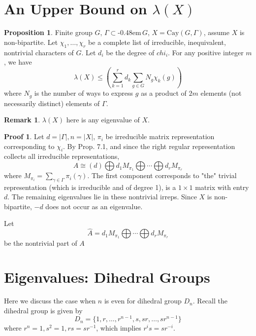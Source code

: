\documentclass{book}
\newcommand{\syin}{$\subset$\kern-0.48em\raisebox{.20ex}{\tiny S}$\,$}
\newcommand{\abs}[1]{\lvert #1 \rvert }
\newcommand{\Cay}[1]{\textrm{Cay}( #1 )}
\theoremstyle{definition}
\newtheorem{proposition}[lemma]{Proposition}
\theoremstyle{remarkstyle}
\newtheorem*{remark}{Remark}%
\newtheorem*{myproof}{Proof}%
\begin{document}
\section{An Upper Bound on $\lambda(X)$}
\begin{proposition}
    Finite group $G$, $\Gamma$\syin$G$, $X=\Cay{G,\Gamma}$, assume $X$ is non-bipartite. Let $\chi_1,\dots,\chi_r$ be a complete list of irreducible, inequivalent, nontrivial characters of $G$. Let $d_i$ be the degree of $chi_i$. For any positive integer $m$, we have 
    $$
    \lambda(X) \le \left(
    \sum^r_{k=1}d_k\sum_{g\in G}N_g\chi_k(g)
    \right)
    $$
    where $N_g$ is the number of ways to express $g$ as a product of $2m$ elements (not necessarily distinct) elements of $\Gamma$.
\end{proposition}
\begin{remark}
    $\lambda(X)$ here is any eigenvalue of $X$.
\end{remark}
\begin{myproof}
    Let $d=\abs{\Gamma}, n=\abs{X}$, $\pi_i$ be irreducible matrix representation corresponding to $\chi_i$. By Prop. 7.1, and since the right regular representation collects all irreducible representations,
    $$
    A \cong (d)\bigoplus d_1M_{\pi_1} \bigoplus \cdots \bigoplus d_rM_{\pi_r}
    $$
    where $M_{\pi_i} = \sum_{\gamma\in\Gamma}\pi_i(\gamma) $. The first component corresponds to "the" trivial representation (which is irreducible and of degree 1), is a $1\times 1$ matrix with entry $d$. The remaining eigenvalues lie in these nontrivial irreps. Since $X$ is non-bipartite, $-d$ does not occur as an eigenvalue. \newline

    Let 
    $$
    \hat{A} = d_1M_{\pi_1} \bigoplus \cdots \bigoplus d_rM_{\pi_r} 
    $$
    be the nontrivial part of $A$
\end{myproof}




\section{Eigenvalues: Dihedral Groups}
Here we discuss the case when $n$ is even for dihedral group $D_n$. Recall the dihedral group is given by 
$$
D_n = \{1, r, \dots, r^{n-1}, s, sr, \dots, sr^{n-1}\}
$$
where $r^n=1,s^2=1,rs=sr^{-1}$, which implies $r^is=sr^{-i} $. \newline 
\end{document}
